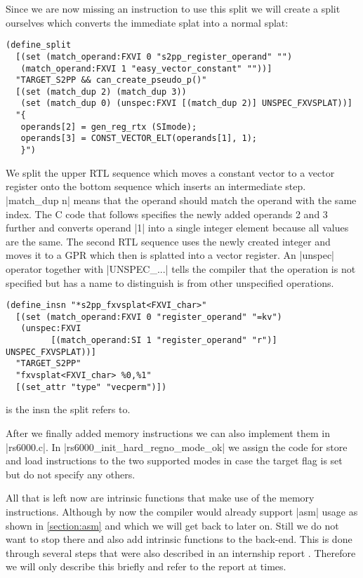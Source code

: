 Since we are now missing an instruction to use this split we will create a split ourselves which converts the immediate splat into a normal splat:
\begin{lstlisting}
(define_split
  [(set (match_operand:FXVI 0 "s2pp_register_operand" "")
   (match_operand:FXVI 1 "easy_vector_constant" ""))]
  "TARGET_S2PP && can_create_pseudo_p()"
  [(set (match_dup 2) (match_dup 3))
   (set (match_dup 0) (unspec:FXVI [(match_dup 2)] UNSPEC_FXVSPLAT))]
  "{
   operands[2] = gen_reg_rtx (SImode);
   operands[3] = CONST_VECTOR_ELT(operands[1], 1);
   }")
\end{lstlisting}

We split the upper RTL sequence which moves a constant vector to a vector register onto the bottom sequence which inserts an intermediate step.
|match_dup n| means that the operand should match the operand with the same index.
The C code that follows specifies the newly added operands 2 and 3 further and converts operand |1| into a single integer element because all values are the same.
The second RTL sequence uses the newly created integer and moves it to a GPR which then is splatted into a vector register.
An |unspec| operator together with |UNSPEC_...| tells the compiler that the operation is not specified but has a name to distinguish is from other unspecified operations.

\begin{lstlisting}
(define_insn "*s2pp_fxvsplat<FXVI_char>"
  [(set (match_operand:FXVI 0 "register_operand" "=kv")
   (unspec:FXVI
         [(match_operand:SI 1 "register_operand" "r")] UNSPEC_FXVSPLAT))]
  "TARGET_S2PP"
  "fxvsplat<FXVI_char> %0,%1"
  [(set_attr "type" "vecperm")])
\end{lstlisting}
is the insn the split refers to.

After we finally added memory instructions we can also implement them in |rs6000.c|.
In |rs6000_init_hard_regno_mode_ok| we assign the code for store and load instructions to the two supported modes in case the target flag is set but do not specify any others.

All that is left now are intrinsic functions that make use of the memory instructions.
Although by now the compiler would already support |asm| usage as shown in \ref{section:asm} and which we will get back to later on.
Still we do not want to stop there and also add intrinsic functions to the back-end.
This is done through several steps that were also described in an internship report \cite{heimbrecht_2017internship}.
Therefore we will only describe this briefly and refer to the report at times.

